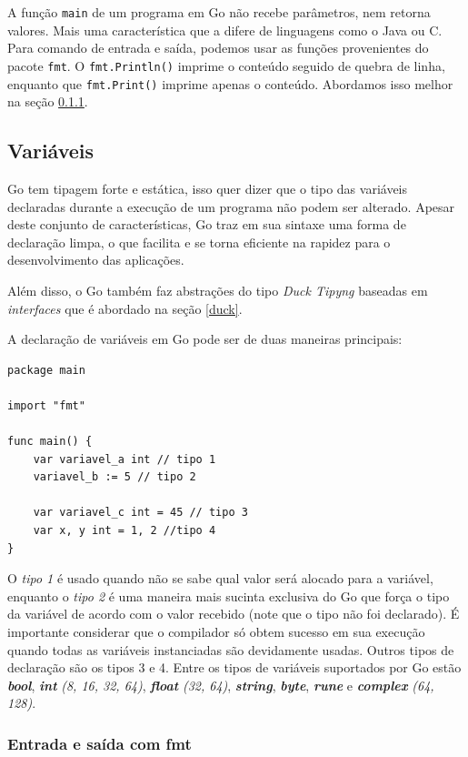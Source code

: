 \documentclass{SBCbookchapter}
\begin{document}
A função \texttt{main} de um programa em Go não recebe parâmetros, nem retorna valores. Mais uma característica que a difere de linguagens como o Java ou C.
Para comando de entrada e saída, podemos usar as funções provenientes do pacote \texttt{fmt}. O \texttt{fmt.Println()} imprime o conteúdo seguido de quebra de linha, enquanto que \texttt{fmt.Print()} imprime apenas o conteúdo. Abordamos isso melhor na seção \ref{secaodeio}.

\subsection{Variáveis}

Go tem tipagem forte e estática, isso quer dizer que o tipo das variáveis declaradas durante a execução de um programa não podem ser alterado. Apesar deste conjunto de características, Go traz em sua sintaxe uma forma de declaração limpa, o que facilita e se torna eficiente na rapidez para o desenvolvimento das aplicações.

Além disso, o Go também faz abstrações do tipo \textit{Duck Tipyng} baseadas em \textit{interfaces} que é abordado na seção \ref{duck}.

A declaração de variáveis em Go pode ser de duas maneiras principais:

\begin{lstlisting}
package main

import "fmt"

func main() {
	var variavel_a int // tipo 1
	variavel_b := 5 // tipo 2
	
	var variavel_c int = 45 // tipo 3
	var x, y int = 1, 2 //tipo 4
}
\end{lstlisting}

O \textit{tipo 1} é usado quando não se sabe qual valor será alocado para a variável, enquanto o \textit{tipo 2} é uma maneira mais sucinta exclusiva do Go que força o tipo da variável de acordo com o valor recebido (note que o tipo não foi declarado). É importante considerar que o compilador só obtem sucesso em sua execução quando todas as variáveis instanciadas são devidamente usadas. Outros tipos de declaração são os tipos 3 e 4. Entre os tipos de variáveis suportados por Go estão \textbf{\textit{bool}}, \textbf{\textit{int}} \textit{(8, 16, 32, 64)}, \textbf{\textit{float}} \textit{(32, 64)}, \textbf{\textit{string}}, \textbf{\textit{byte}}, \textbf{\textit{rune}} e \textbf{\textit{complex}} \textit{(64, 128)}.

\subsubsection{Entrada e saída com fmt}
\label{secaodeio}
\end{document}
